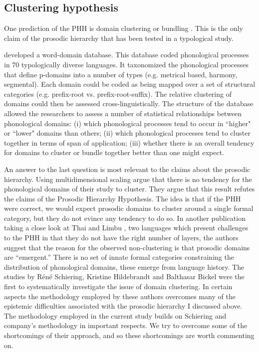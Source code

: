 \documentclass[output=paper,hidelinks]{langscibook}
\begin{document}
\subsection{Clustering hypothesis}

One prediction of the PHH is domain clustering or bundling \citep{bennett2019syntax}. This is the only claim of the prosodic hierarchy that has been tested in a typological study.

\citet{bickel2009distribution, schiering2012stress} developed a word-domain database. This database coded phonological processes in 70 typologically diverse languages. It taxonomized the phonological processes that define p-domains into a number of types (e.g. metrical based, harmony, segmental). Each domain could be coded as being mapped over a set of structural categories (e.g. prefix-root vs. prefix-root-suffix). The relative clustering of domains could then be assessed cross-linguistically. The structure of the database allowed the researchers to assess a number of statistical relationships between phonological domains: (i) which phonological processes tend to occur in ``higher" or ``lower" domains than others; (ii) which phonological processes tend to cluster together in terms of span of application; (iii) whether there is an overall tendency for domains to cluster or bundle together better than one might expect.

An answer to the last question is most relevant to the claims about the prosodic hierarchy. Using multidimensional scaling \citet{bickel2009distribution} argue that there is no tendency for the phonological domains of their study to cluster. They argue that this result refutes the claims of the Prosodic Hierarchy Hypothesis. The idea is that if the PHH were correct, we would expect prosodic domains to cluster around a single formal category, but they do not evince any tendency to do so. In another publication taking a close look at Thai and Limbu \citep{schiering2010prosodic}, two languages which present challenges to the PHH in that they do not have the right number of layers, the authors suggest that the reason for the observed non-clustering is that prosodic domains are ``emergent.'' There is no set of innate formal categories constraining the distribution of phonological domains, these emerge from language history.
The studies by Réné Schiering, Kristine Hildebrandt and Balthasar Bickel were the first to systematically investigate the issue of domain clustering. In certain aspects the methodology employed by these authors overcomes many of the epistemic difficulties associated with the prosodic hierarchy I discussed above. The methodology employed in the current study builds on Schiering and company's methodology in important respects. We try to overcome some of the shortcomings of their approach, and so these shortcomings are worth commenting on.
\end{document}
